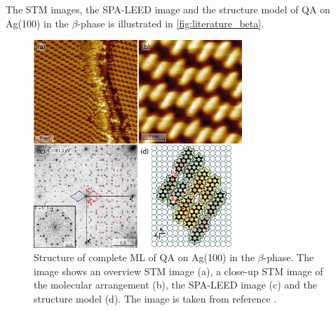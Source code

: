 The \ac{STM} images, the \ac{SPA-LEED} image and the structure model of \ac{QA} on Ag(100) in the $\beta$-phase is illustrated in \autoref{fig:literature_beta}.
\begin{figure}[htb]
	\centering
	\includegraphics[width=0.7\textwidth]{images/literature_beta.png}
	\caption{Structure of complete \ac{ML} of \ac{QA} on Ag(100) in the $\beta$-phase. The image shows an overview \ac{STM} image (a), a close-up \ac{STM} image of the molecular arrangement (b), the \ac{SPA-LEED} image (c) and the structure model (d). The image is taken from reference \cite{Humberg2024}.}
	\label{fig:literature_beta}
\end{figure}
\cleardoublepage